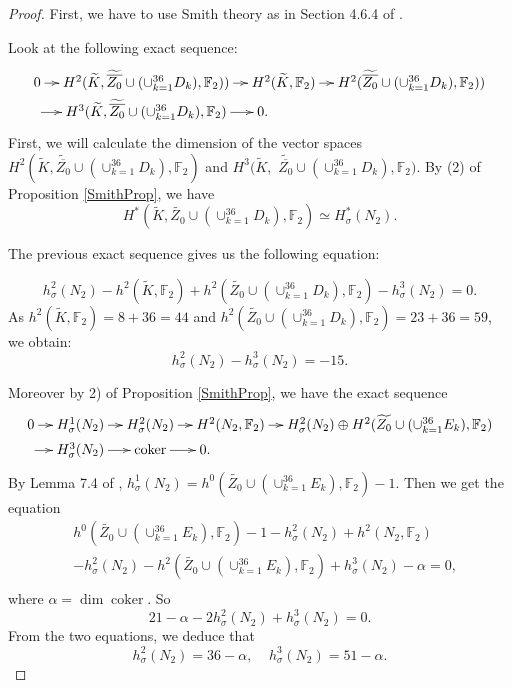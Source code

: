 \documentclass{alggeom}
\DeclareMathOperator{\coker}{coker}
\theoremstyle{plain}
\theoremstyle{definition}
\theoremstyle{remark}
\begin{document}
\begin{proof}
First, we have to use Smith theory as in Section 4.6.4 of \cite{Lol}.

Look at the following exact sequence:
$$\xymatrix@C=10pt@R0pt{0\ar[r] &H^{2}(\widetilde{K},\widetilde{\overline{Z_{0}}}\cup(\cup_{k=1}^{36}D_{k}),\mathbb{F}_{2}))\ar[r]&H^{2}(\widetilde{K},\mathbb{F}_{2}) \ar[r]& H^{2}(\widetilde{\overline{Z_{0}}}\cup(\cup_{k=1}^{36}D_{k}),\mathbb{F}_{2}))\\
\ar[r]&H^{3}(\widetilde{K},\widetilde{\overline{Z_{0}}}\cup(\cup_{k=1}^{36}D_{k}),\mathbb{F}_{2})\ar[r] &0.\ \ \ \ \ \ \ \ \ &
}$$
First, we will calculate the dimension of the vector spaces $H^{2}(\widetilde{K},\widetilde{\overline{Z_{0}}}\cup(\cup_{k=1}^{36}D_{k}),\mathbb{F}_{2})$ and $H^{3}(\widetilde{K},$ $\widetilde{\overline{Z_{0}}}\cup(\cup_{k=1}^{36}D_{k}),\mathbb{F}_{2})$.
By (2) of Proposition \ref{SmithProp}, we have 
$$H^{*}(\widetilde{K},\widetilde{Z_{0}}\cup(\cup_{k=1}^{36}D_{k}),\mathbb{F}_{2})\simeq H^{*}_{\sigma}(N_{2}).$$

The previous exact sequence gives us the following equation:

$$h^{2}_{\sigma}(N_{2})-h^{2}(\widetilde{K},\mathbb{F}_{2})+h^{2}(\widetilde{Z_{0}}\cup(\cup_{k=1}^{36}D_{k}),\mathbb{F}_{2})-h^{3}_{\sigma}(N_{2})=0.$$
As $h^{2}(\widetilde{K},\mathbb{F}_{2})=8+36=44$ and $h^{2}(\widetilde{Z_{0}}\cup(\cup_{k=1}^{36}D_{k}),\mathbb{F}_{2})=23+36=59$, we obtain:
$$h^{2}_{\sigma}(N_{2})-h^{3}_{\sigma}(N_{2})=-15.$$

Moreover by 2) of Proposition \ref{SmithProp}, we have the exact sequence
$$\xymatrix@C=10pt@R0pt{0\ar[r] &H^{1}_{\sigma}(N_{2})\ar[r]&H^{2}_{\sigma}(N_{2}) \ar[r]&H^{2}(N_{2},\mathbb{F}_{2}) \ar[r]&H^{2}_{\sigma}(N_{2})\oplus H^{2}(\widetilde{Z_{0}}\cup(\cup_{k=1}^{36}E_{k}),\mathbb{F}_{2})\\
\ar[r]&H^{3}_{\sigma}(N_{2})\ar[r]&\coker\ar[r] &0.\ \ \ \ \ \ \ \ \ \ \  &
}$$
By Lemma 7.4 of \cite{BNS}, $h^{1}_{\sigma}(N_{2})=h^{0}(\widetilde{Z_{0}}\cup(\cup_{k=1}^{36}E_{k}),\mathbb{F}_{2})-1$.
Then we get the equation
\begin{align*}
&h^{0}(\widetilde{Z_{0}}\cup(\cup_{k=1}^{36}E_{k}),\mathbb{F}_{2})-1-h^{2}_{\sigma}(N_{2})+h^{2}(N_{2},\mathbb{F}_{2})\\
&-h^{2}_{\sigma}(N_{2})-h^{2}(\widetilde{Z_{0}}\cup(\cup_{k=1}^{36}E_{k}),\mathbb{F}_{2})+h^{3}_{\sigma}(N_{2})-\alpha=0,\\
\end{align*}
where $\alpha=\dim \coker$.
So
$$21-\alpha-2h^{2}_{\sigma}(N_2)+h^{3}_{\sigma}(N_2)=0.$$
From the two equations, we deduce that
$$h^{2}_{\sigma}(N_{2})=36-\alpha,\ \ \ \ \ h^{3}_{\sigma}(N_{2})=51-\alpha.$$


\end{proof}
\end{document}
